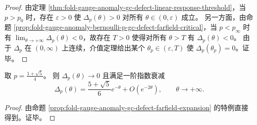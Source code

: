 \begin{proof}
由定理 \ref{thm:fold-gauge-anomaly-gc-defect-linear-response-threshold}，当 \(p>p_0\) 时，存在 \(\varepsilon>0\) 使 \(\Delta_p(\theta)>0\) 对所有 \(\theta\in(0,\varepsilon)\) 成立。
另一方面，由命题 \ref{prop:fold-gauge-anomaly-bernoulli-p-gc-defect-farfield-critical}，当 \(p<p_\infty\) 时有
\(
\lim_{\theta\to+\infty}\Delta_p(\theta)<0
\)，故存在 \(T>0\) 使得对所有 \(\theta>T\) 有 \(\Delta_p(\theta)<0\)。
由于 \(\Delta_p\) 在 \((0,\infty)\) 上连续，介值定理给出某个 \(\theta_p\in(\varepsilon,T)\) 使 \(\Delta_p(\theta_p)=0\)。证毕。
\end{proof}

\begin{corollary}[黄金偏置处的零温中性与一阶指数衰减]\label{cor:fold-gauge-anomaly-gc-defect-golden-neutral}
取 \(p=\frac{1+\sqrt5}{4}\)。
则 \(\Delta_p(\theta)\to 0\) 且满足一阶指数衰减
\[
\Delta_p(\theta)=\frac{5+\sqrt5}{6}e^{-\theta}+O(e^{-2\theta}),
\qquad \theta\to+\infty.
\]
\end{corollary}

\begin{proof}
由命题 \ref{prop:fold-gauge-anomaly-gc-defect-farfield-expansion} 的特例直接得到。证毕。
\end{proof}

\endinput

